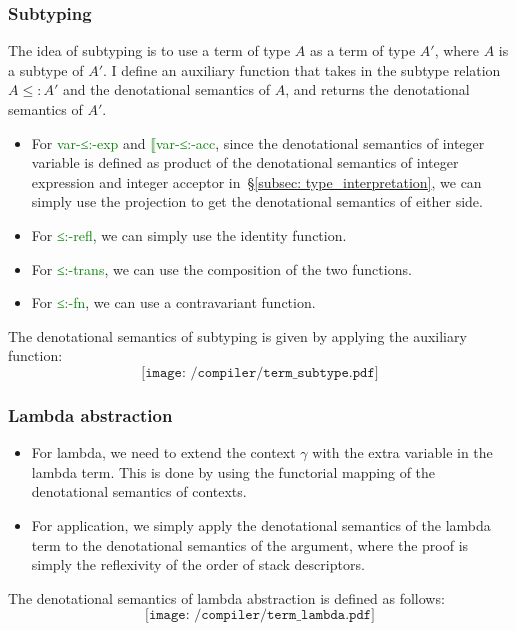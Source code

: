 \documentclass[12pt,a4paper]{report}
\theoremstyle{definition}
\newcommand{\secref}[1]{\S\ref{#1}}
\newcommand{\gn}[1]{\textcolor{green}{#1}}
\newcommand{\gnt}[1]{\gn{\textsf{#1}}}
\begin{document}
        \subsubsection{Subtyping}
        The idea of subtyping is to use a term of type $A$ as a term of type $A'$, where $A$ is a subtype of $A'$. I define an auxiliary function that takes in the subtype relation $A\leq:A'$ and the denotational semantics of $A$, and returns the denotational semantics of $A'$. 
        \begin{itemize}
            \item For \gnt{var-≤:-exp} and \gnt{⟦var-≤:-acc}, since the denotational semantics of integer variable is defined as product of the denotational semantics of integer expression and integer acceptor in~\secref{subsec: type_interpretation}, we can simply use the projection to get the denotational semantics of either side.
            \item For \gnt{≤:-refl}, we can simply use the identity function.
            \item For \gnt{≤:-trans}, we can use the composition of the two functions.
            \item For \gnt{≤:-fn}, we can use a contravariant function.
        \end{itemize}
        The denotational semantics of subtyping is given by applying the auxiliary function:
        \[\texttt{[image: /compiler/term\_subtype.pdf]}\]

        \subsubsection{Lambda abstraction}
        \begin{itemize}
            \item For lambda, we need to extend the context $\gamma$ with the extra variable in the lambda term. This is done by using the functorial mapping of the denotational semantics of contexts.
            \item For application, we simply apply the denotational semantics of the lambda term to the denotational semantics of the argument, where the proof is simply the reflexivity of the order of stack descriptors.
        \end{itemize}
        The denotational semantics of lambda abstraction is defined as follows:
        \[\texttt{[image: /compiler/term\_lambda.pdf]}\]
\end{document}

